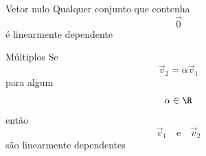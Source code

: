 \documentclass[fleqn,aspectratio=169,12pt]{beamer}
\begin{document}
\begin{frame}{Vetor nulo}
  Qualquer conjunto que contenha
  \[
    \vec{0}
  \]
  \pause
  é linearmente dependente
\end{frame}

\begin{frame}{Múltiplos}
  Se
  \[
    \vec{v}_2 = \alpha\vec{v}_1
  \]
  \pause
  para algum
  \[
    \alpha\in\R
  \]
  \pause
  então
  \[
    \vec{v}_1
    \quad\text{e}\quad
    \vec{v}_2
  \]
  \pause
  são linearmente dependentes
\end{frame}



%
%

\end{document}
